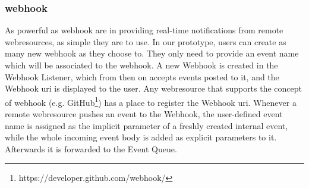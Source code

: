 \subsubsection{\gls{webhook}}
As powerful as \textrm{\gls{webhook}} are in providing real-time notifications from remote \textrm{\glspl{webresource}}, as simple they are to use.
In our prototype, users can create as many new \textrm{\gls{webhook}} as they choose to.
They only need to provide an event name which will be associated to the \textrm{\gls{webhook}}.
A new \textrm{Webhook} is created in the \textrm{Webhook Listener}, which from then on accepts events posted to it, and the \textrm{Webhook \acrshort{uri}} is displayed to the user.
Any \textrm{\gls{webresource}} that supports the concept of \textrm{\gls{webhook}} (e.g. \textrm{GitHub}\footnote{https://developer.github.com/\gls{webhook}/}) has a place to register the \textrm{Webhook} \textrm{\acrshort{uri}}.
Whenever a remote \textrm{\gls{webresource}} pushes an event to the \textrm{Webhook}, the user-defined event name is assigned as the implicit parameter of a freshly created internal event, while the whole incoming event body is added as explicit parameters to it.
Afterwards it is forwarded to the \textrm{Event Queue}.



